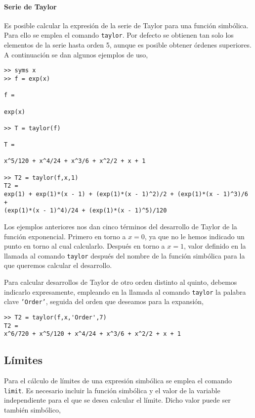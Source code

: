 \paragraph{Serie de Taylor} Es posible calcular la expresión de la serie de Taylor para una función simbólica. Para ello se emplea el comando \texttt{taylor}. Por defecto se obtienen tan solo los elementos de la serie hasta orden 5, aunque es posible obtener órdenes superiores. A continuación se dan algunos ejemplos de uso,
\begin{verbatim}
>> syms x
>> f = exp(x)
 
f =
 
exp(x)
 
>> T = taylor(f)
 
T =
 
x^5/120 + x^4/24 + x^3/6 + x^2/2 + x + 1
 
>> T2 = taylor(f,x,1)
T2 =
exp(1) + exp(1)*(x - 1) + (exp(1)*(x - 1)^2)/2 + (exp(1)*(x - 1)^3)/6 +
(exp(1)*(x - 1)^4)/24 + (exp(1)*(x - 1)^5)/120
\end{verbatim}

Los ejemplos anteriores nos dan cinco términos del desarrollo de Taylor de la función exponencial. Primero en torno a $x = 0$, ya que no le hemos indicado un punto en torno al cual calcularlo. Después en torno a $x = 1$, valor definido en la llamada al comando \texttt{taylor} después del nombre de la función simbólica para la que queremos calcular el desarrollo.

Para calcular desarrollos de Taylor de otro orden distinto al quinto, debemos indicarlo expresamente, empleando en la llamada al comando \texttt{taylor} la palabra clave \texttt{'Order'}, seguida del orden que deseamos para la expansión,

\begin{verbatim}
>> T2 = taylor(f,x,'Order',7) 
T2 = 
x^6/720 + x^5/120 + x^4/24 + x^3/6 + x^2/2 + x + 1
\end{verbatim} 

\subsection{Límites} 
Para el cálculo de límites de una expresión simbólica se emplea el comando \texttt{limit}. Es necesario incluir la función simbólica y el valor de la variable independiente para el que se desea calcular el límite.  Dicho valor puede ser también simbólico,

